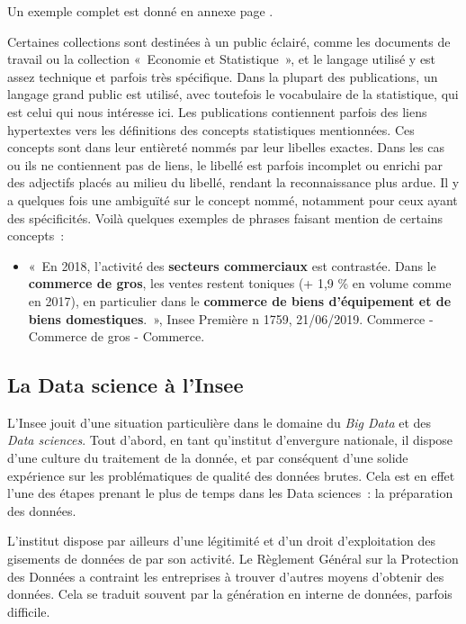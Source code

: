 Un exemple complet est donné en annexe page \pageref{publication-xml}.
\newline

Certaines collections sont destinées à un public éclairé, comme les documents de travail ou la collection «~Economie et Statistique~», et le langage utilisé y est assez technique et parfois très spécifique. Dans la plupart des publications, un langage grand public est utilisé, avec toutefois le vocabulaire de la statistique, qui est celui qui nous intéresse ici. Les publications contiennent parfois des liens hypertextes vers les définitions des concepts statistiques mentionnées. Ces concepts sont dans leur entièreté nommés par leur libelles exactes. Dans les cas ou ils ne contiennent pas de liens, le libellé est parfois incomplet ou enrichi par des adjectifs placés au milieu du libellé, rendant la reconnaissance plus ardue. Il y a quelques fois une ambiguïté sur le concept nommé, notamment pour ceux ayant des spécificités. Voilà quelques exemples de phrases faisant mention de certains concepts~:
\begin{itemize}
    \item «~En 2018, l'activité des \textbf{secteurs commerciaux} est contrastée. Dans le \textbf{commerce de gros}, les ventes restent toniques (+ 1,9 \% en volume comme en 2017), en particulier dans le \textbf{commerce de biens d'équipement et de biens domestiques}.~», Insee Première n 1759, 21/06/2019.
    Commerce - Commerce de gros - Commerce.
\end{itemize}
\label{section 1.2.2}

\subsection{La Data science à l'Insee}

L'Insee jouit d'une situation particulière dans le domaine du \textit{Big Data} et des \textit{Data sciences}. Tout d'abord, en tant qu'institut d'envergure nationale, il dispose d'une culture du traitement de la donnée, et par conséquent d'une solide expérience sur les problématiques de qualité des données brutes. Cela est en effet l'une des étapes prenant le plus de temps dans les Data sciences~: la préparation des données.
\newline

L'institut dispose par ailleurs d'une légitimité et d'un droit d'exploitation des gisements de données de par son activité. Le Règlement Général sur la Protection des Données a contraint les entreprises à trouver d'autres moyens d'obtenir des données. Cela se traduit souvent par la génération en interne de données, parfois difficile.
\newline

